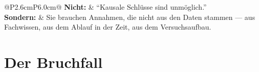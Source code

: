 \begin{merksatz}
\begin{center}
{\small
\renewcommand{\arraystretch}{1.5}
\begin{tabular}{@{}P{2.6cm}P{6.0cm}@{}}
\toprule
\textbf{Nicht:} & \enquote{Kausale Schlüsse sind unmöglich.}\\
\textbf{Sondern:} & Sie brauchen Annahmen, die nicht aus den Daten stammen --- aus Fachwissen, aus dem Ablauf in der Zeit, aus dem Versuchsaufbau.\\
\bottomrule
\end{tabular}}
\end{center}

\begin{center}
\begin{minipage}{0.88\textwidth}
\end{minipage}
\end{center}
\end{merksatz}

\section{Der Bruchfall}

